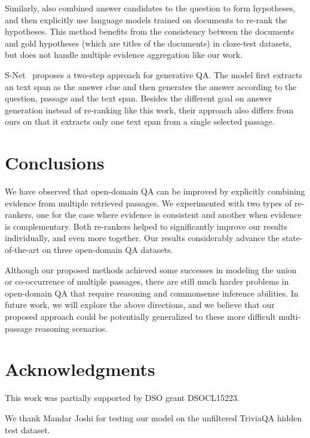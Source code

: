 \documentclass{article} \usepackage{iclr2018_conference,times}
\begin{document}
Similarly, \citep{cui2016attention} also combined answer candidates to the question to form hypotheses, and then explicitly use language models trained on documents to re-rank the hypotheses. This method benefits from the consistency between the documents and gold hypotheses (which are titles of the documents) in cloze-test datasets, but does not handle multiple evidence aggregation like our work.

S-Net~\citep{tan2017s} proposes a two-step approach for generative QA. The model first extracts an text span as the answer clue and then generates the answer according to the question, passage and the text span. Besides the different goal on answer generation instead of re-ranking like this work, their approach also differs from ours on that it extracts only one text span from a single selected passage. 
 
\section{Conclusions}
We have observed that open-domain QA can be improved by explicitly combining evidence from multiple retrieved passages. We experimented with two types of re-rankers, one for the case where evidence is consistent and another when evidence is complementary. Both re-rankers helped to significantly improve our results individually, and even more together.  Our results considerably advance the state-of-the-art on three open-domain QA datasets.

Although our proposed methods achieved some successes in modeling the union or co-occurrence of multiple passages, there are still much harder problems in open-domain QA that require reasoning and commonsense inference abilities.
In future work, we will explore the above directions, and we believe that our proposed approach could be potentially generalized to these more difficult multi-passage reasoning scenarios.
\section{Acknowledgments}
This work was partially supported by DSO grant DSOCL15223.

We thank Mandar Joshi for testing our model on the unfiltered TriviaQA hidden test dataset.



\end{document}
